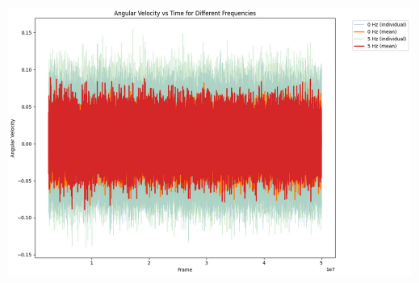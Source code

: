 \begin{figure}
  \begin{center}
    \includegraphics[width=0.95\textwidth]{figures/velocityVsTime.png}
  \end{center}
  \caption{}\label{fig:velocityvstime}
\end{figure}


